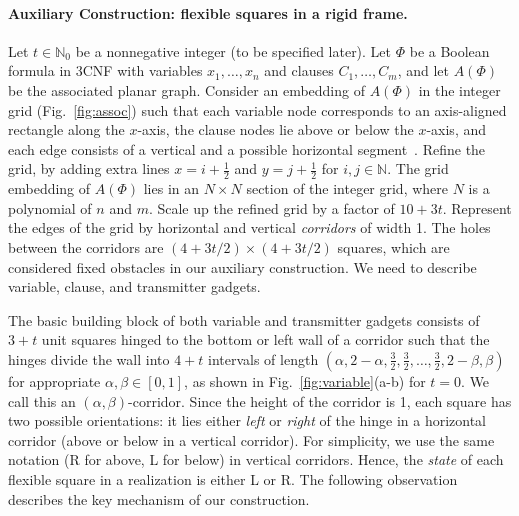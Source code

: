 \documentclass{llncs}
\begin{document}
\paragraph{Auxiliary Construction: flexible squares in a rigid frame.}
Let $t\in \mathbb{N}_0$ be a nonnegative integer (to be specified later). Let $\Phi$ be a Boolean formula in 3CNF with variables $x_1,\ldots , x_n$ and clauses $C_1,\ldots ,C_m$, and let $A(\Phi)$ be the associated planar graph. Consider an embedding of $A(\Phi)$ in the integer grid (Fig.~\ref{fig:assoc}) such that each variable node corresponds to an axis-aligned rectangle along the $x$-axis, the clause nodes lie above or below the $x$-axis, and each edge consists of a vertical and a possible horizontal segment~\cite{KR92}. Refine the grid, by adding extra lines $x=i+\frac{1}{2}$ and $y=j+\frac{1}{2}$ for $i,j\in \mathbb{N}$. The grid embedding of $A(\Phi)$ lies in an $N\times N$ section of the integer grid, where $N$ is a polynomial of $n$ and $m$. Scale up the refined grid by a factor of $10+3t$.
Represent the edges of the grid by horizontal and vertical \emph{corridors} of width 1. The holes between the corridors are $(4+3t/2)\times (4+3t/2)$ squares, which are considered fixed obstacles in our auxiliary construction. We need to describe variable, clause, and transmitter gadgets.

The basic building block of both variable and transmitter gadgets consists of $3+t$ unit squares hinged to the bottom or left wall of a corridor such that the hinges divide the wall into $4+t$ intervals of length $(\alpha, 2-\alpha, \frac{3}{2},\frac{3}{2},\ldots, \frac{3}{2}, 2-\beta, \beta)$ for appropriate $\alpha,\beta\in [0,1]$, as shown in Fig.~\ref{fig:variable}(a-b) for $t=0$. We call this  an $(\alpha,\beta)$-corridor. Since the height of the corridor is 1, each square has two possible orientations: it lies either \emph{left} or \emph{right} of the hinge in a horizontal corridor (above or below in a vertical corridor). For simplicity, we use the same notation (R for above, L for below) in vertical corridors. Hence, the \emph{state} of each flexible square in a realization is either L or R. The following observation describes the key mechanism of our construction.
\end{document}
